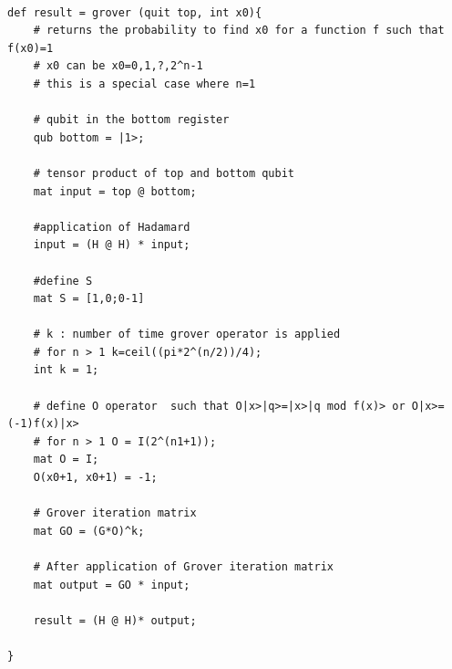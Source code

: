 \begin{lstlisting}

def result = grover (quit top, int x0){
	# returns the probability to find x0 for a function f such that f(x0)=1
	# x0 can be x0=0,1,?,2^n-1
	# this is a special case where n=1
	
	# qubit in the bottom register
	qub bottom = |1>;
	
	# tensor product of top and bottom qubit
	mat input = top @ bottom;
	
	#application of Hadamard
	input = (H @ H) * input;
	
	#define S
	mat S = [1,0;0-1]
	
	# k : number of time grover operator is applied
	# for n > 1 k=ceil((pi*2^(n/2))/4);
	int k = 1;
	
	# define O operator  such that O|x>|q>=|x>|q mod f(x)> or O|x>=(-1)f(x)|x> 
	# for n > 1 O = I(2^(n1+1));
	mat O = I;
	O(x0+1, x0+1) = -1;
	
	# Grover iteration matrix
	mat GO = (G*O)^k;
	
	# After application of Grover iteration matrix
	mat output = GO * input;
	
	result = (H @ H)* output;
	
}

\end{lstlisting}
